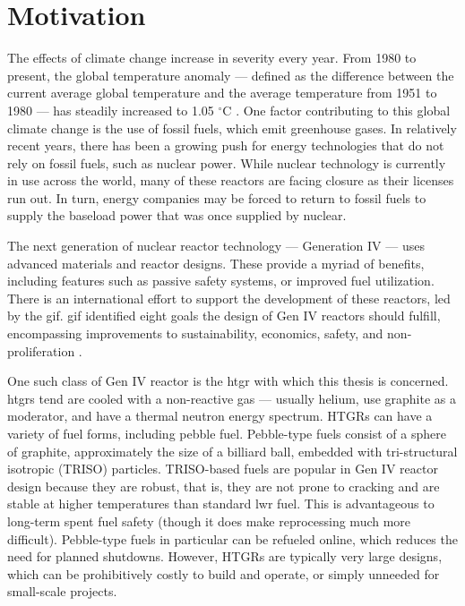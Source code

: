 \label{intro}
\section{Motivation}

The effects of climate change increase in severity every year. From 1980 to present, the global temperature anomaly --- defined as the difference between the current average global temperature and the average temperature from 1951 to 1980 --- has steadily increased to 1.05 $^{\circ}$C \cite{gistemp_team_giss_2022,lenssen_improvements_2019}.  One factor contributing to this global climate change is the use of fossil fuels, which emit greenhouse gases.  In relatively recent years, there has been a growing push for energy technologies that do not rely on fossil fuels, such as nuclear power.  While nuclear technology is currently in use across the world, many of these reactors are facing closure as their licenses run out.  In turn, energy companies may be forced to return to fossil fuels to supply the baseload power that was once supplied by nuclear.  

The next generation of nuclear reactor technology --- Generation IV --- uses advanced materials and reactor designs.  These provide a myriad of benefits, including features such as passive safety systems, or improved fuel utilization.  There is an international effort to support the development of these reactors, led by the \acrfull{gif}.  \acrshort{gif} identified eight goals the design of Gen IV reactors should fulfill, encompassing improvements to sustainability, economics, safety, and non-proliferation \cite{gen_iv_international_forum_gif_2021}.

One such class of Gen IV reactor is the \acrfull{htgr} with which this thesis is concerned.  \acrshort{htgr}s tend are cooled with a non-reactive gas --- usually helium, use graphite as a moderator, and have a thermal neutron energy spectrum.  HTGRs can have a variety of fuel forms, including pebble fuel.  Pebble-type fuels consist of a sphere of graphite, approximately the size of a billiard ball, embedded with tri-structural isotropic (TRISO) particles.  TRISO-based fuels are popular in Gen IV reactor design because they are robust, that is, they are not prone to cracking and are stable at higher temperatures than standard \acrfull{lwr} fuel.  This is advantageous to long-term spent fuel safety (though it does make reprocessing much more difficult).  Pebble-type fuels in particular can be refueled online, which reduces the need for planned shutdowns.  However, HTGRs are typically very large designs, which can be prohibitively costly to build and operate, or simply unneeded for small-scale projects.

